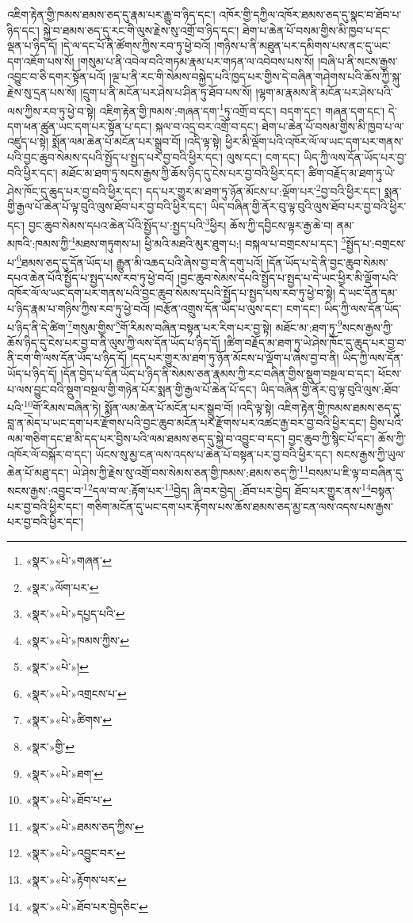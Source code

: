 འཇིག་རྟེན་གྱི་ཁམས་ཐམས་ཅད་དུ་རྣམ་པར་རྒྱུ་བ་ཉིད་དང་། འཁོར་གྱི་དཀྱིལ་འཁོར་ཐམས་ཅད་དུ་སྣང་བ་ཐོབ་པ་ཉིད་དང་། སྐྱེ་བ་ཐམས་ཅད་དུ་རང་གི་ལུས་རྗེས་སུ་འགྲོ་བ་ཉིད་དང་། ཐེག་པ་ཆེན་པོ་བསམ་གྱིས་མི་ཁྱབ་པ་དང་ལྡན་པ་ཉིད་དོ། །དེ་ལ་དང་པོ་ནི་ཚོགས་ཀྱིས་རབ་ཏུ་ཕྱེ་བའོ། །གཉིས་པ་ནི་མཐུན་པར་དམིགས་པས་ནང་དུ་ཡང་དག་འཇོག་པས་སོ། །གསུམ་པ་ནི་འབེལ་བའི་གཏམ་རྣམ་པར་གཏན་ལ་འབེབས་པས་སོ། །བཞི་པ་ནི་སངས་རྒྱས་འབྱུང་བ་ཅི་དགར་སྟོན་པའོ། །ལྔ་པ་ནི་རང་གི་སེམས་བསྐྱེད་པའི་ཁྱད་པར་གྱིས་དེ་བཞིན་གཤེགས་པའི་ཆོས་ཀྱི་སྐུ་རྗེས་སུ་དྲན་པས་སོ། །དྲུག་པ་ནི་མངོན་པར་ཤེས་པ་ཤིན་ཏུ་ཐོབ་པས་སོ། །ལྷག་མ་རྣམས་ནི་མངོན་པར་ཤེས་པའི་ལས་ཀྱིས་རབ་ཏུ་ཕྱེ་བ་སྟེ། འཇིག་རྟེན་གྱི་ཁམས་:གཞན་དག་\footnote{«སྣར་»«པེ་»གཞན་}ཏུ་འགྲོ་བ་དང་། བདག་དང་། གཞན་དག་དང་། དེ་དག་ཕན་ཚུན་ཡང་དག་པར་སྟོན་པ་དང་། སྐལ་བ་འདྲ་བར་འགྲོ་བ་དང་། ཐེག་པ་ཆེན་པོ་བསམ་གྱིས་མི་ཁྱབ་པ་ལ་འཛུད་པ་སྟེ། སྨོན་ལམ་ཆེན་པོ་མངོན་པར་སྒྲུབ་བོ། །འདི་ལྟ་སྟེ། ཕྱིར་མི་ལྡོག་པའི་འཁོར་ལོ་ལ་ཡང་དག་པར་གནས་པའི་བྱང་ཆུབ་སེམས་དཔའི་སྤྱོད་པ་སྤྱད་པར་བྱ་བའི་ཕྱིར་དང་། ལུས་དང་། ངག་དང་། ཡིད་ཀྱི་ལས་དོན་ཡོད་པར་བྱ་བའི་ཕྱིར་དང་། མཐོང་མ་ཐག་ཏུ་སངས་རྒྱས་ཀྱི་ཆོས་ཉིད་དུ་ངེས་པར་བྱ་བའི་ཕྱིར་དང་། ཚིག་བརྗོད་མ་ཐག་ཏུ་ཡེ་ཤེས་ཁོང་དུ་ཆུད་པར་བྱ་བའི་ཕྱིར་དང་། དད་པར་གྱུར་མ་ཐག་ཏུ་ཉོན་མོངས་པ་:ལྡོག་པར་\footnote{«སྣར་»ལོག་པར་}བྱ་བའི་ཕྱིར་དང་། སྨན་གྱི་རྒྱལ་པོ་ཆེན་པོ་ལྟ་བུའི་ལུས་ཐོབ་པར་བྱ་བའི་ཕྱིར་དང་། ཡིད་བཞིན་གྱི་ནོར་བུ་ལྟ་བུའི་ལུས་ཐོབ་པར་བྱ་བའི་ཕྱིར་དང་། བྱང་ཆུབ་སེམས་དཔའ་ཆེན་པོའི་སྤྱོད་པ་:སྤྱད་པའི་\footnote{«སྣར་»«པེ་»དཔྱད་པའི་}ཕྱིར། ཆོས་ཀྱི་དབྱིངས་ལྟར་རྒྱ་ཆེ་བ། ནམ་མཁའི་:ཁམས་ཀྱི་\footnote{«སྣར་»«པེ་»ཁམས་ཀྱིས་}མཐས་གཏུགས་པ། ཕྱི་མའི་མཐའི་མུར་ཐུག་པ:། བསྐལ་པ་བགྲངས་པ་དང་། \footnote{«སྣར་»«པེ་»།  }སྤྱོད་པ་:བགྲངས་པ་\footnote{«སྣར་»«པེ་»འགྲངས་པ་}ཐམས་ཅད་དུ་དོན་ཡོད་པ། རྒྱུན་མི་འཆད་པའི་ཞེས་བྱ་བ་ནི་དགུ་པའོ། །དོན་ཡོད་པ་དེ་ནི་བྱང་ཆུབ་སེམས་དཔའ་ཆེན་པོའི་སྤྱོད་པ་སྤྱད་པས་རབ་ཏུ་ཕྱེ་བའོ། །བྱང་ཆུབ་སེམས་དཔའི་སྤྱོད་པ་སྤྱད་པ་དེ་ཡང་ཕྱིར་མི་ལྡོག་པའི་འཁོར་ལོ་ལ་ཡང་དག་པར་གནས་པའི་བྱང་ཆུབ་སེམས་དཔའི་སྤྱོད་པ་སྤྱད་པས་རབ་ཏུ་ཕྱེ་བ་སྟེ། དེ་ཡང་དོན་དམ་པ་ཉིད་རྣམ་པ་གཉིས་ཀྱིས་རབ་ཏུ་ཕྱེ་བའོ། །བརྩོན་འགྲུས་དོན་ཡོད་པ་ལུས་དང་། ངག་དང་། ཡིད་ཀྱི་ལས་དོན་ཡོད་པ་ཉིད་ནི་དེ་ཚིག་\footnote{«སྣར་»«པེ་»ཚིགས་}གསུམ་གྱིས་\footnote{«སྣར་»གྱི་}གོ་རིམས་བཞིན་བསྟན་པར་རིག་པར་བྱ་སྟེ། མཐོང་མ་:ཐག་ཏུ་\footnote{«སྣར་»«པེ་»ཐག་}སངས་རྒྱས་ཀྱི་ཆོས་ཉིད་དུ་ངེས་པར་བྱ་བ་ནི་ལུས་ཀྱི་ལས་དོན་ཡོད་པ་ཉིད་དོ། །ཚིག་བརྗོད་མ་ཐག་ཏུ་ཡེ་ཤེས་ཁོང་དུ་ཆུད་པར་བྱ་བ་ནི་ངག་གི་ལས་དོན་ཡོད་པ་ཉིད་དོ། །དད་པར་གྱུར་མ་ཐག་ཏུ་ཉོན་མོངས་པ་ལྡོག་པ་ཞེས་བྱ་བ་ནི། ཡིད་ཀྱི་ལས་དོན་ཡོད་པ་ཉིད་དོ། །དོན་བྱེད་པ་དོན་ཡོད་པ་ཉིད་ནི་སེམས་ཅན་རྣམས་ཀྱི་རང་བཞིན་གྱིས་སྡུག་བསྔལ་བ་དང་། ཕོངས་པ་ལས་བྱུང་བའི་སྡུག་བསྔལ་གྱི་གཉེན་པོར་སྨན་གྱི་རྒྱལ་པོ་ཆེན་པོ་དང་། ཡིད་བཞིན་གྱི་ནོར་བུ་ལྟ་བུའི་ལུས་:ཐོབ་པའི་\footnote{«སྣར་»«པེ་»ཐོབ་པ་}གོ་རིམས་བཞིན་ཏེ། སྨོན་ལམ་ཆེན་པོ་མངོན་པར་སྒྲུབ་བོ། །འདི་ལྟ་སྟེ། འཇིག་རྟེན་གྱི་ཁམས་ཐམས་ཅད་དུ་བླ་ན་མེད་པ་ཡང་དག་པར་རྫོགས་པའི་བྱང་ཆུབ་མངོན་པར་རྫོགས་པར་འཚང་རྒྱ་བར་བྱ་བའི་ཕྱིར་དང་། བྱིས་པའི་ལམ་གཅིག་དང་ཐ་མི་དད་པར་བྱིས་པའི་ལམ་ཐམས་ཅད་དུ་སྐྱེ་བ་འབྱུང་བ་དང་། བྱང་ཆུབ་ཀྱི་སྙིང་པོ་དང་། ཆོས་ཀྱི་འཁོར་ལོ་བསྐོར་བ་དང་། ཡོངས་སུ་མྱ་ངན་ལས་འདས་པ་ཆེན་པོ་བསྟན་པར་བྱ་བའི་ཕྱིར་དང་། སངས་རྒྱས་ཀྱི་ཡུལ་ཆེན་པོ་མཐུ་དང་། ཡེ་ཤེས་ཀྱི་རྗེས་སུ་འགྲོ་བས་སེམས་ཅན་གྱི་ཁམས་:ཐམས་ཅད་ཀྱི་\footnote{«སྣར་»«པེ་»ཐམས་ཅད་ཀྱིས་}བསམ་པ་ཇི་ལྟ་བ་བཞིན་དུ་སངས་རྒྱས་:འབྱུང་བ་\footnote{«སྣར་»«པེ་»འབྱུང་བར་}དལ་བ་ལ་:རྟོག་པར་\footnote{«སྣར་»«པེ་»རྟོགས་པར་}བྱེད། ཞི་བར་བྱེད། :ཐོབ་པར་བྱེད། ཐོབ་པར་གྱུར་ནས་\footnote{«སྣར་»«པེ་»ཐོབ་པར་བྱེདཅིང་}བསྟན་པར་བྱ་བའི་ཕྱིར་དང་། གཅིག་མངོན་དུ་ཡང་དག་པར་རྟོགས་པས་ཆོས་ཐམས་ཅད་མྱ་ངན་ལས་འདས་པས་རྒྱས་པར་བྱ་བའི་ཕྱིར་དང་། 